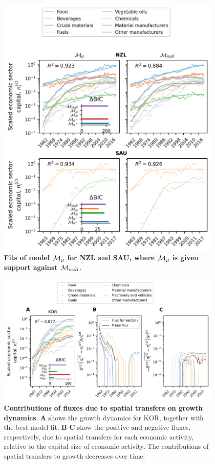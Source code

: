 \FloatBarrier
\begin{figure}
  \center
  \includegraphics{figures/SI/figure_mu_simulate.png}
  \caption{\small \textbf{Fits of model $\mathcal{M}_\mu$ for NZL and SAU, where $\mathcal{M}_\mu$ is given support against $\mathcal{M}_{null}$}. 
   }\label{figSI:fit_mu}
\end{figure}
\FloatBarrier

\begin{figure}
  \center
  \includegraphics{figures/SI/flux_delta.png}
  \caption{\small \textbf{Contributions of fluxes due to spatial transfers on growth dynamics}. \textbf{A} shows the growth dynamics for KOR, together with the best model fit. \textbf{B}-\textbf{C} show the positive and negative fluxes, respectively, due to spatial transfers for each economic activity, relative to the capital size of economic activity. The contributions of spatial transfers to growth decreases over time.
   }\label{figSI:flux_delta}
\end{figure}
\FloatBarrier

